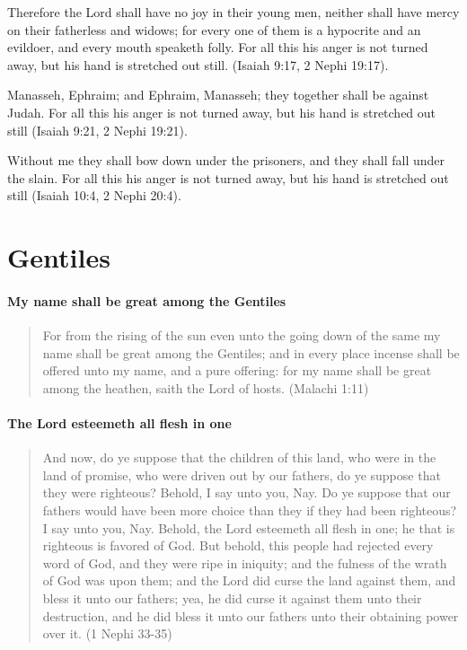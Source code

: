 Therefore the Lord shall have no joy in their young men, neither shall have mercy on their fatherless and widows; for every one of them is a hypocrite and an evildoer, and every mouth speaketh folly. For all this his anger is not turned away, but his hand is stretched out still. (Isaiah 9:17, 2 Nephi 19:17).

Manasseh, Ephraim; and Ephraim, Manasseh; they together shall be against Judah. For all this his anger is not turned away, but his hand is stretched out still (Isaiah 9:21, 2 Nephi 19:21).

Without me they shall bow down under the prisoners, and they shall fall under the slain. For all this his anger is not turned away, but his hand is stretched out still (Isaiah 10:4, 2 Nephi 20:4).

\section{Gentiles}

\paragraph{My name shall be great among the Gentiles}
\begin{quotation}
For from the rising of the sun even unto the going down of the same my name shall be great among the Gentiles; and in every place incense shall be offered unto my name, and a pure offering: for my name shall be great among the heathen, saith the Lord of hosts. (Malachi 1:11)
\end{quotation}

\paragraph{The Lord esteemeth all flesh in one}
\begin{quotation}
And now, do ye suppose that the children of this land, who were in the land of promise, who were driven out by our fathers, do ye suppose that they were righteous? Behold, I say unto you, Nay. Do ye suppose that our fathers would have been more choice than they if they had been righteous? I say unto you, Nay. Behold, the Lord esteemeth all flesh in one; he that is righteous is favored of God. But behold, this people had rejected every word of God, and they were ripe in iniquity; and the fulness of the wrath of God was upon them; and the Lord did curse the land against them, and bless it unto our fathers; yea, he did curse it against them unto their destruction, and he did bless it unto our fathers unto their obtaining power over it. (1 Nephi 33-35)
\end{quotation}

